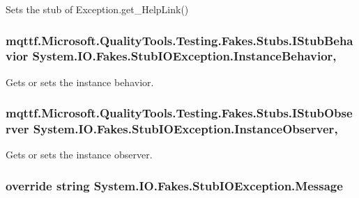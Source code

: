 Sets the stub of Exception.\-get\-\_\-\-Help\-Link()

\hypertarget{class_system_1_1_i_o_1_1_fakes_1_1_stub_i_o_exception_ab3c74a2239f5d7f6c9303af4c040de8e}{
\subsubsection[{Instance\-Behavior}]{\setlength{\rightskip}{0pt plus 5cm}mqttf.\-Microsoft.\-Quality\-Tools.\-Testing.\-Fakes.\-Stubs.\-I\-Stub\-Behavior System.\-I\-O.\-Fakes.\-Stub\-I\-O\-Exception.\-Instance\-Behavior\hspace{0.3cm}{\ttfamily [get]}, {\ttfamily [set]}}}\label{class_system_1_1_i_o_1_1_fakes_1_1_stub_i_o_exception_ab3c74a2239f5d7f6c9303af4c040de8e}


Gets or sets the instance behavior.

\hypertarget{class_system_1_1_i_o_1_1_fakes_1_1_stub_i_o_exception_adf91b424cd1b54cc7b1c6d1d8ce6cdf8}{
\subsubsection[{Instance\-Observer}]{\setlength{\rightskip}{0pt plus 5cm}mqttf.\-Microsoft.\-Quality\-Tools.\-Testing.\-Fakes.\-Stubs.\-I\-Stub\-Observer System.\-I\-O.\-Fakes.\-Stub\-I\-O\-Exception.\-Instance\-Observer\hspace{0.3cm}{\ttfamily [get]}, {\ttfamily [set]}}}\label{class_system_1_1_i_o_1_1_fakes_1_1_stub_i_o_exception_adf91b424cd1b54cc7b1c6d1d8ce6cdf8}


Gets or sets the instance observer.

\hypertarget{class_system_1_1_i_o_1_1_fakes_1_1_stub_i_o_exception_a54d30baeddd144ffe04ca65b6a29d47c}{
\subsubsection[{Message}]{\setlength{\rightskip}{0pt plus 5cm}override string System.\-I\-O.\-Fakes.\-Stub\-I\-O\-Exception.\-Message\hspace{0.3cm}{\ttfamily [get]}}}\label{class_system_1_1_i_o_1_1_fakes_1_1_stub_i_o_exception_a54d30baeddd144ffe04ca65b6a29d47c}


